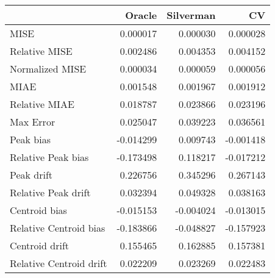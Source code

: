 \begin{tabular}{lrrr}
  \hline
 & Oracle & Silverman & CV \\ 
  \hline
MISE & 0.000017 & 0.000030 & 0.000028 \\ 
  Relative MISE & 0.002486 & 0.004353 & 0.004152 \\ 
  Normalized MISE & 0.000034 & 0.000059 & 0.000056 \\ 
  MIAE & 0.001548 & 0.001967 & 0.001912 \\ 
  Relative MIAE & 0.018787 & 0.023866 & 0.023196 \\ 
  Max Error & 0.025047 & 0.039223 & 0.036561 \\ 
  Peak bias & -0.014299 & 0.009743 & -0.001418 \\ 
  Relative Peak bias & -0.173498 & 0.118217 & -0.017212 \\ 
  Peak drift & 0.226756 & 0.345296 & 0.267143 \\ 
  Relative Peak drift & 0.032394 & 0.049328 & 0.038163 \\ 
  Centroid bias & -0.015153 & -0.004024 & -0.013015 \\ 
  Relative Centroid bias & -0.183866 & -0.048827 & -0.157923 \\ 
  Centroid drift & 0.155465 & 0.162885 & 0.157381 \\ 
  Relative Centroid drift & 0.022209 & 0.023269 & 0.022483 \\ 
   \hline
\end{tabular}
